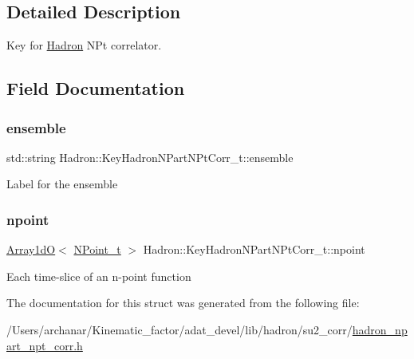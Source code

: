 \subsection{Detailed Description}
Key for \mbox{\hyperlink{namespaceHadron}{Hadron}} N\+Pt correlator. 

\subsection{Field Documentation}
\mbox{\label{structHadron_1_1KeyHadronNPartNPtCorr__t_a39e829b0115935227246882dee1a2365}} 
\subsubsection{\texorpdfstring{ensemble}{ensemble}}
{\footnotesize\ttfamily std\+::string Hadron\+::\+Key\+Hadron\+N\+Part\+N\+Pt\+Corr\+\_\+t\+::ensemble}

Label for the ensemble \mbox{\label{structHadron_1_1KeyHadronNPartNPtCorr__t_aa2c10fa6d139966599ca71514a4a85a7}} 
\subsubsection{\texorpdfstring{npoint}{npoint}}
{\footnotesize\ttfamily \mbox{\hyperlink{classADAT_1_1Array1dO}{Array1dO}}$<$ \mbox{\hyperlink{structHadron_1_1KeyHadronNPartNPtCorr__t_1_1NPoint__t}{N\+Point\+\_\+t}} $>$ Hadron\+::\+Key\+Hadron\+N\+Part\+N\+Pt\+Corr\+\_\+t\+::npoint}

Each time-\/slice of an n-\/point function 

The documentation for this struct was generated from the following file\+:\begin{DoxyCompactItemize}
\item 
/\+Users/archanar/\+Kinematic\+\_\+factor/adat\+\_\+devel/lib/hadron/su2\+\_\+corr/\mbox{\hyperlink{lib_2hadron_2su2__corr_2hadron__npart__npt__corr_8h}{hadron\+\_\+npart\+\_\+npt\+\_\+corr.\+h}}\end{DoxyCompactItemize}
